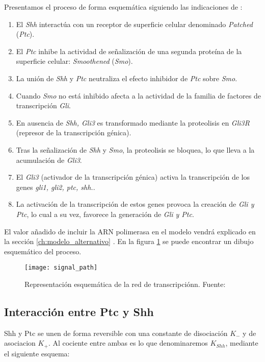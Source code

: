  
 
 
 Presentamos el proceso de forma esquemática siguiendo las  indicaciones de \cite{schaffer}:
 \begin{enumerate}
 	\item El \textit{Shh} interactúa con un receptor de superficie celular denominado \textit{Patched }(\textit{Ptc}).
 	\item El \textit{Ptc} inhibe la actividad de señalización de una segunda proteína de la superficie celular: \textit{Smoothened }(\textit{Smo}).
 	\item La unión de \textit{Shh} y \textit{Ptc} neutraliza el efecto inhibidor  de \textit{Ptc} sobre \textit{Smo}.
 	\item Cuando \textit{Smo} no está inhibido afecta a la actividad de la familia de factores de transcripción \textit{Gli}.
 	\item En ausencia de\textit{ Shh, Gli3} es transformado mediante la proteolisis en \textit{Gli3R} (represor de la transcripción génica).
 	\item Tras la señalización de \textit{Shh} y \textit{Smo}, la proteolisis se bloquea, lo que lleva a la acumulación de \textit{Gli3}.
 	\item El \textit{Gli3} (activador de la transcripción génica) activa la transcripción de los genes \textit{gli1, gli2, ptc, shh.}.
 	\item La activación de la transcripción de estos genes provoca la creación de\textit{ Gli y Ptc}, lo cual a su vez, favorece la generación de \textit{Gli y Ptc}.
 \end{enumerate}
 
 El valor añadido de incluir la ARN polimerasa en el modelo vendrá explicado en la sección \ref{ch:modelo_alternativo} .
 En la figura \ref{signal_path} se puede encontrar un dibujo esquemático del proceso.
  \begin{figure}[h]
  	\texttt{[image: signal\_path]}
  	\centering
  	\caption{Representación esquemática de la red de transcripciónn. Fuente: \cite{schaffer}}
  	\label{signal_path}
  \end{figure}
  
 
 
 \subsection{Interacción entre Ptc y Shh}
 Shh y Ptc se unen de forma reversible con una constante de disociación $K_-$ y de asociacion $K_+$. Al cociente entre ambas es lo que denominaremos $K_{Shh}$, mediante el siguiente esquema: 
 

